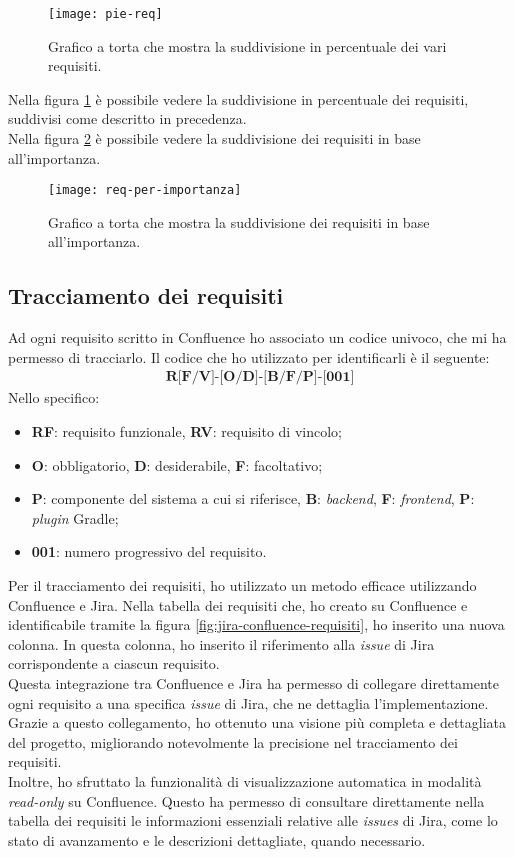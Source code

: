 \begin{figure}[!h] 
  \centering 
  \texttt{[image: pie-req]} 
  \caption{Grafico a torta che mostra la suddivisione in percentuale dei vari requisiti.}
  \label{fig:pie-req}
\end{figure}
\noindent Nella figura \ref*{fig:pie-req} è possibile vedere la suddivisione in percentuale dei requisiti, 
suddivisi come descritto in precedenza.\\
Nella figura \ref*{fig:req-per-importanza} è possibile vedere la suddivisione dei requisiti in base all'importanza.
\begin{figure}[!h] 
  \centering 
  \texttt{[image: req-per-importanza]} 
  \caption{Grafico a torta che mostra la suddivisione dei requisiti in base all'importanza.}
  \label{fig:req-per-importanza}
\end{figure}

\subsection{Tracciamento dei requisiti}
Ad ogni requisito scritto in Confluence ho associato un codice univoco, che mi ha permesso di tracciarlo.
Il codice che ho utilizzato per identificarli è il seguente:
\begin{align*}
  \textbf{R[F/V]-[O/D]-[B/F/P]-[001]}
\end{align*}
Nello specifico:
\begin{itemize}
    \item \textbf{RF}: requisito funzionale, \textbf{RV}: requisito di vincolo;
    \item \textbf{O}: obbligatorio, \textbf{D}: desiderabile, \textbf{F}: facoltativo;
    \item \textbf{P}: componente del sistema a cui si riferisce, \textbf{B}: \textit{backend}, \textbf{F}: \textit{frontend}, \textbf{P}: \textit{plugin} Gradle;
    \item \textbf{001}: numero progressivo del requisito.
\end{itemize}

\noindent Per il tracciamento dei requisiti, ho utilizzato un metodo efficace utilizzando Confluence e Jira. 
Nella tabella dei requisiti che, ho creato su Confluence e identificabile tramite la figura \ref*{fig:jira-confluence-requisiti}, 
ho inserito una nuova colonna. In questa colonna, ho inserito il riferimento alla \textit{issue} di 
Jira corrispondente a ciascun requisito.\\
Questa integrazione tra Confluence e Jira ha permesso di collegare direttamente ogni requisito a una specifica 
\textit{issue} di Jira, che ne dettaglia l'implementazione. Grazie a questo collegamento, ho ottenuto una visione più 
completa e dettagliata del progetto, migliorando notevolmente la precisione nel tracciamento dei requisiti.\\
Inoltre, ho sfruttato la funzionalità di visualizzazione automatica in modalità \textit{read-only} su Confluence. 
Questo ha permesso di consultare direttamente nella tabella dei requisiti le informazioni essenziali relative alle \textit{issues} 
di Jira, come lo stato di avanzamento e le descrizioni dettagliate, quando necessario.

